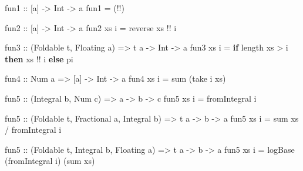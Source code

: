 \documentclass[]{article}
\newenvironment{Shaded}{}{}
\newcommand{\DataTypeTok}[1]{\textcolor[rgb]{0.56,0.13,0.00}{#1}}
\newcommand{\FunctionTok}[1]{\textcolor[rgb]{0.02,0.16,0.49}{#1}}
\newcommand{\KeywordTok}[1]{\textcolor[rgb]{0.00,0.44,0.13}{\textbf{#1}}}
\newcommand{\NormalTok}[1]{#1}
\newcommand{\OperatorTok}[1]{\textcolor[rgb]{0.40,0.40,0.40}{#1}}
\newcommand{\OtherTok}[1]{\textcolor[rgb]{0.00,0.44,0.13}{#1}}
\begin{document}
\begin{Shaded}
\begin{Highlighting}[]
\OtherTok{fun1 ::}\NormalTok{ [a] }\OtherTok{{-}\textgreater{}} \DataTypeTok{Int} \OtherTok{{-}\textgreater{}}\NormalTok{ a}
\NormalTok{fun1 }\OtherTok{=}\NormalTok{ (}\OperatorTok{!!}\NormalTok{)}

\OtherTok{fun2 ::}\NormalTok{ [a] }\OtherTok{{-}\textgreater{}} \DataTypeTok{Int} \OtherTok{{-}\textgreater{}}\NormalTok{ a}
\NormalTok{fun2 xs i }\OtherTok{=} \FunctionTok{reverse}\NormalTok{ xs }\OperatorTok{!!}\NormalTok{ i}

\OtherTok{fun3 ::}\NormalTok{ (}\DataTypeTok{Foldable}\NormalTok{ t, }\DataTypeTok{Floating}\NormalTok{ a) }\OtherTok{=\textgreater{}}\NormalTok{ t a }\OtherTok{{-}\textgreater{}} \DataTypeTok{Int} \OtherTok{{-}\textgreater{}}\NormalTok{ a}
\NormalTok{fun3 xs i }\OtherTok{=} \KeywordTok{if} \FunctionTok{length}\NormalTok{ xs }\OperatorTok{\textgreater{}}\NormalTok{ i }\KeywordTok{then}\NormalTok{ xs }\OperatorTok{!!}\NormalTok{ i }\KeywordTok{else} \FunctionTok{pi}

\OtherTok{fun4 ::} \DataTypeTok{Num}\NormalTok{ a }\OtherTok{=\textgreater{}}\NormalTok{ [a] }\OtherTok{{-}\textgreater{}} \DataTypeTok{Int} \OtherTok{{-}\textgreater{}}\NormalTok{ a}
\NormalTok{fun4 xs i }\OtherTok{=} \FunctionTok{sum}\NormalTok{ (}\FunctionTok{take}\NormalTok{ i xs)}

\OtherTok{fun5 ::}\NormalTok{ (}\DataTypeTok{Integral}\NormalTok{ b, }\DataTypeTok{Num}\NormalTok{ c) }\OtherTok{=\textgreater{}}\NormalTok{ a }\OtherTok{{-}\textgreater{}}\NormalTok{ b }\OtherTok{{-}\textgreater{}}\NormalTok{ c}
\NormalTok{fun5 xs i }\OtherTok{=} \FunctionTok{fromIntegral}\NormalTok{ i}

\OtherTok{fun5 ::}\NormalTok{ (}\DataTypeTok{Foldable}\NormalTok{ t, }\DataTypeTok{Fractional}\NormalTok{ a, }\DataTypeTok{Integral}\NormalTok{ b) }\OtherTok{=\textgreater{}}\NormalTok{ t a }\OtherTok{{-}\textgreater{}}\NormalTok{ b }\OtherTok{{-}\textgreater{}}\NormalTok{ a}
\NormalTok{fun5 xs i }\OtherTok{=} \FunctionTok{sum}\NormalTok{ xs }\OperatorTok{/} \FunctionTok{fromIntegral}\NormalTok{ i}

\OtherTok{fun5 ::}\NormalTok{ (}\DataTypeTok{Foldable}\NormalTok{ t, }\DataTypeTok{Integral}\NormalTok{ b, }\DataTypeTok{Floating}\NormalTok{ a) }\OtherTok{=\textgreater{}}\NormalTok{ t a }\OtherTok{{-}\textgreater{}}\NormalTok{ b }\OtherTok{{-}\textgreater{}}\NormalTok{ a}
\NormalTok{fun5 xs i }\OtherTok{=} \FunctionTok{logBase}\NormalTok{ (}\FunctionTok{fromIntegral}\NormalTok{ i) (}\FunctionTok{sum}\NormalTok{ xs)}
\end{Highlighting}
\end{Shaded}
\end{document}
